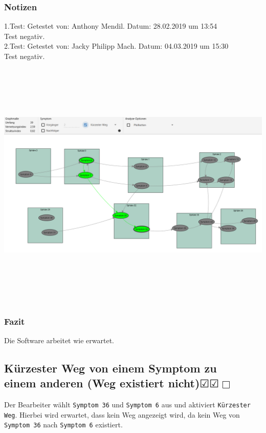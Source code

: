 \documentclass[enabledeprecatedfontcommands]{scrartcl}
\newcommand{\subsectiont}[2]{\subsection[#1]{#1{\normalsize\normalfont #2}}}
\newcommand{\leer}{$\Box$}
\newcommand{\ok}{$\CheckedBox$}
\begin{document}
\subsubsection{Notizen}
1.Test: Getestet von: Anthony Mendil. Datum: 28.02.2019 um 13:54 \\
Test negativ. \\
2.Test: Getestet von: Jacky Philipp Mach. Datum: 04.03.2019 um 15:30 \\
Test negativ.
\begin{center}
\includegraphics[height=12cm, angle=90]{analysekuerzersterWegExistiert.PNG}
\end{center}
\subsubsection{Fazit}
Die Software arbeitet wie erwartet.

\subsectiont{Kürzester Weg von einem Symptom zu \\einem anderen (Weg existiert nicht)}{\dotfill\ok\ok\leer}
Der Bearbeiter wählt \texttt{Symptom 36} und \texttt{Symptom 6} aus und aktiviert \texttt{Kürzester Weg}. Hierbei wird erwartet, dass kein Weg angezeigt wird, da kein Weg von \texttt{Symptom 36} nach \texttt{Symptom 6} existiert. 
\end{document}
